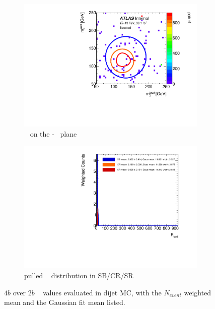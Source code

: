 \begin{figure}[htb!]
\centering
\captionsetup{justification=centering}
	\hspace{-1cm}
    \begin{subfigure}[b]{0.4\textwidth}
        \includegraphics[width=\textwidth,angle=-90]{figures/boosted/AppendixMuqcdstudy/QCD_FourTag_Incl_mH0H1.pdf}
        \caption{\muqcd~ on the \mleadJ-\msublJ~ plane}
        \label{fig:app-muqcd-4b-2d-qcd}
    \end{subfigure}
    \quad \quad \quad \quad 
    \begin{subfigure}[b]{0.4\textwidth}
        \includegraphics[width=\textwidth,angle=-90]{figures/boosted/AppendixMuqcdstudy/QCD_FourTag_Incl_mH0H1_pull.pdf}
        \caption{pulled \muqcd~ distribution in SB/CR/SR}
        \label{fig:app-muqcd-4b-pull-qcd}
    \end{subfigure}
\caption{$4b$ over $2b$ \muqcd~ values evaluated in dijet MC, with the $N_{event}$ weighted mean and the Gaussian fit mean listed.}
\label{fig:app-muqcd-4b-qcd}
\end{figure}